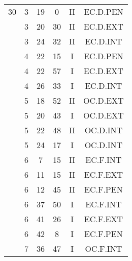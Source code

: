 \documentclass[12pt, a4paper]{article}
\begin{document}
\begin{multicols}{3}
{\begin{tabular}{c c c c c c}
	 	 	 	30 & 3 & 19 & 0 & II & EC.D.PEN\\%
	 	 	 	 & 3 & 20 & 30 & II & EC.D.EXT\\%
	 	 	 	 & 3 & 24 & 32 & II & EC.D.INT\\%
	 	 	 	 & 4 & 22 & 15 & I & EC.D.PEN\\%
	 	 	 	 & 4 & 22 & 57 & I & EC.D.EXT\\%
	 	 	 	 & 4 & 26 & 33 & I & EC.D.INT\\%
	 	 	 	 & 5 & 18 & 52 & II & OC.D.EXT\\%
	 	 	 	 & 5 & 20 & 43 & I & OC.D.EXT\\%
	 	 	 	 & 5 & 22 & 48 & II & OC.D.INT\\%
	 	 	 	 & 5 & 24 & 17 & I & OC.D.INT\\%
	 	 	 	 & 6 & 7 & 15 & II & EC.F.INT\\%
	 	 	 	 & 6 & 11 & 15 & II & EC.F.EXT\\%
	 	 	 	 & 6 & 12 & 45 & II & EC.F.PEN\\%
	 	 	 	 & 6 & 37 & 50 & I & EC.F.INT\\%
	 	 	 	 & 6 & 41 & 26 & I & EC.F.EXT\\%
	 	 	 	 & 6 & 42 & 8 & I & EC.F.PEN\\%
	 	 	 	 & 7 & 36 & 47 & I & OC.F.INT\\%
	 	 \end{tabular}
 	}
\end{multicols}
\end{document}
